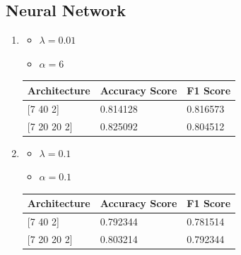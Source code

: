 \documentclass[letterpaper]{article}
\begin{document}
\subsection*{Neural Network}
\begin{enumerate}[label=(\alph*)]
	\item \begin{itemize}
		      \item $\lambda = 0.01$
		      \item $\alpha = 6$
	      \end{itemize}

	      \begin{table}[H]
		      \centering
		      \begin{tabular}{|l|l|l|}
			      \hline
			      Architecture    & Accuracy Score & F1 Score \\ \hline
			      {[}7 40 2{]}    & 0.814128       & 0.816573 \\ \hline
			      {[}7 20 20 2{]} & 0.825092       & 0.804512 \\ \hline
		      \end{tabular}
	      \end{table}
	\item \begin{itemize}
		      \item $\lambda = 0.1$
		      \item $\alpha = 0.1$
	      \end{itemize}

	      \begin{table}[H]
		      \centering
		      \begin{tabular}{|l|l|l|}
			      \hline
			      Architecture    & Accuracy Score & F1 Score \\ \hline
			      {[}7 40 2{]}    & 0.792344       & 0.781514 \\ \hline
			      {[}7 20 20 2{]} & 0.803214       & 0.792344 \\ \hline
		      \end{tabular}
	      \end{table}
\end{enumerate}
\end{document}
